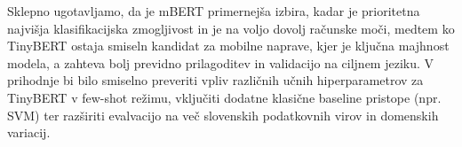 \documentclass[sigconf,nonacm]{acmart}
\begin{document}
Sklepno ugotavljamo, da je mBERT primernejša izbira, kadar je prioritetna najvišja klasifikacijska zmogljivost in je na voljo dovolj računske moči, medtem ko TinyBERT ostaja smiseln kandidat za mobilne naprave, kjer je ključna majhnost modela, a zahteva bolj previdno prilagoditev in validacijo na ciljnem jeziku. V prihodnje bi bilo smiselno preveriti vpliv različnih učnih hiperparametrov za TinyBERT v few-shot režimu, vključiti dodatne klasične baseline pristope (npr. SVM) ter razširiti evalvacijo na več slovenskih podatkovnih virov in domenskih variacij.




\end{document}
